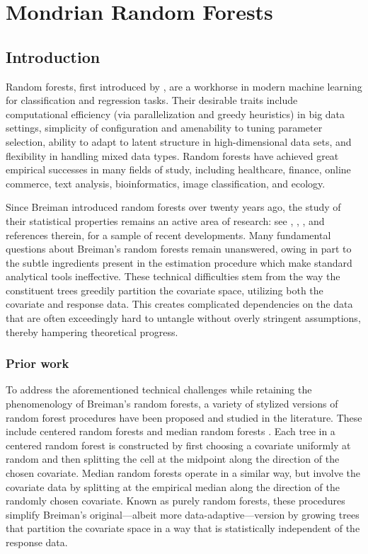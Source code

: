 \chapter{Mondrian Random Forests}

\section{Introduction}

Random forests, first introduced by \citet{breiman2001random},
are a workhorse in modern machine learning
for classification and regression tasks.
Their desirable traits include computational efficiency
(via parallelization and greedy heuristics)
in big data settings, simplicity of configuration and
amenability to tuning parameter selection, ability to
adapt to latent structure in high-dimensional data sets, and flexibility in
handling mixed data types.
Random forests have achieved great empirical successes in many
fields of study, including
healthcare, finance, online commerce,
text analysis, bioinformatics, image classification, and ecology.

Since Breiman introduced random forests over twenty years ago, the study of
their statistical properties remains an active area of research:
see \citet{Scornet-Biau-Vert_2015_AOS}, \citet{Chi-Vossler-Fan-Lv_2022_AOS},
\citet{klusowski2021universal}, and references therein, for a sample of recent
developments. Many fundamental questions about Breiman's random forests
remain unanswered, owing in part to the subtle ingredients
present in the estimation procedure which
make standard analytical tools ineffective.
These technical difficulties stem from the way the constituent trees greedily
partition the covariate space, utilizing both the covariate and response
data. This creates complicated dependencies on the data that are often
exceedingly hard to untangle without overly stringent assumptions, thereby
hampering theoretical progress.

\subsection{Prior work}

To address the aforementioned technical challenges while retaining the
phenomenology of Breiman's random forests, a variety of stylized
versions of random forest procedures have been proposed and
studied in the literature.
These include centered random forests
\citep{biau2012analysis, arnould2023interpolation}
and median random forests
\citep{duroux2016impact, arnould2023interpolation}.
Each tree in a centered random forest is constructed by first choosing a
covariate uniformly at random and then splitting the cell at the midpoint along
the direction of the chosen covariate. Median random forests operate in a
similar way, but involve the covariate data by splitting at the empirical
median along the direction of the randomly chosen covariate.
Known as purely random forests, these procedures simplify Breiman's
original---albeit more data-adaptive---version by growing trees that partition
the covariate space in a way that is statistically independent
of the response data.

